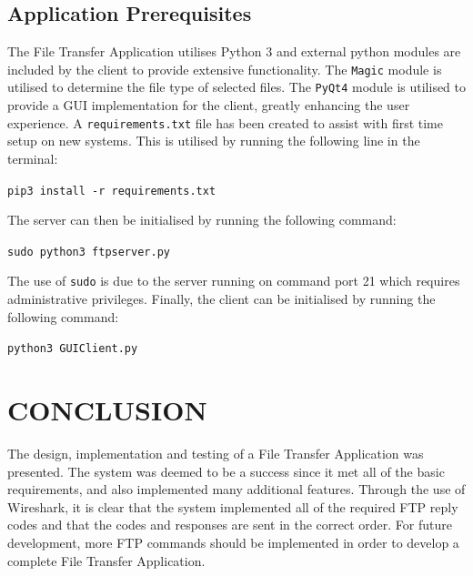 \documentclass[10pt,twocolumn]{witseiepaper}
\begin{document}
\subsection{Application Prerequisites}
The File Transfer Application utilises Python 3 and external python modules are included by the client to provide extensive functionality. The \texttt{Magic} module is utilised  to determine the file type of selected files. The \texttt{PyQt4} module is utilised to provide a GUI implementation for the client, greatly enhancing the user experience. A \texttt{requirements.txt} file has been created to assist with first time setup on new systems. This is utilised by running the following line in the terminal:

\texttt{pip3 install -r requirements.txt}

The server can then be initialised by running the following command:

\texttt{sudo python3 ftpserver.py}

The use of \texttt{sudo} is due to the server running on command port 21 which requires administrative privileges. Finally, the client can be initialised by running the following command:

\texttt{python3 GUIClient.py}

\section{CONCLUSION} \label{sec:conclusion}
The design, implementation and testing of a File Transfer Application was presented. The system was deemed to be a success since it met all of the basic requirements, and also implemented many additional features. Through the use of Wireshark, it is clear that the system implemented all of the required FTP reply codes and that the codes and responses are sent in the correct order. For future development, more FTP commands should be implemented in order to develop a complete File Transfer Application.

%
\balance



\end{document}

